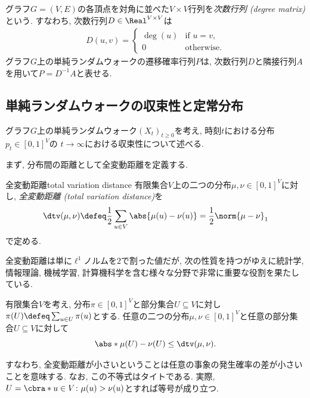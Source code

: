   グラフ$G=(V,E)$の各頂点を対角に並べた$V\times V$行列を\emph{次数行列 (degree matrix)}という.
  すなわち, 次数行列$D\in \Real^{V\times V}$は
  \begin{align*}
    D(u,v) = \begin{cases}
      \deg(u)	& \text{if }u=v,\\
      0 & \text{otherwise}.
    \end{cases}
  \end{align*}
  グラフ$G$上の単純ランダムウォークの遷移確率行列$P$は, 次数行列$D$と隣接行列$A$を用いて$P=D^{-1}A$と表せる.

\subsection{単純ランダムウォークの収束性と定常分布} \label{sec:SRW convergence}
グラフ$G$上の単純ランダムウォーク$(X_t)_{t\ge 0}$を考え, 時刻$t$における分布$p_t \in [0,1]^V$の
$t\to \infty$における収束性について述べる.

まず, 分布間の距離として全変動距離を定義する.
\begin{definition}{全変動距離}{total variation distance}
  有限集合$V$上の二つの分布$\mu,\nu \in[0,1]^V$に対し, \emph{全変動距離 (total variation distance)}を
  \[
    \dtv (\mu ,\nu ) \defeq \frac{1}{2} \sum_{u\in V}\abs{\mu(u) - \nu(u)} = \frac{1}{2} \norm{\mu - \nu}_1
  \]
  で定める.
\end{definition}
全変動距離は単に$\ell^1$ノルムを$2$で割った値だが, 次の性質を持つがゆえに統計学, 情報理論, 機械学習, 計算機科学を含む様々な分野で非常に重要な役割を果たしている.
\begin{proposition}{}{}
  有限集合$V$を考え, 分布$\pi\in[0,1]^V$と部分集合$U\subseteq V$に対し$\pi(U)\defeq\sum_{u\in U}\pi(u)$とする.
  任意の二つの分布$\mu,\nu\in[0,1]^V$と任意の部分集合$U\subseteq V$に対して
  \[
    \abs*{ \mu(U) - \nu(U) } \le \dtv(\mu,\nu).
  \]
\end{proposition}
すなわち,
全変動距離が小さいということは任意の事象の発生確率の差が小さいことを意味する.
なお, この不等式はタイトである.
実際, $U=\cbra*{ u\in V \colon \mu(u) > \nu(u) }$とすれば等号が成り立つ.

